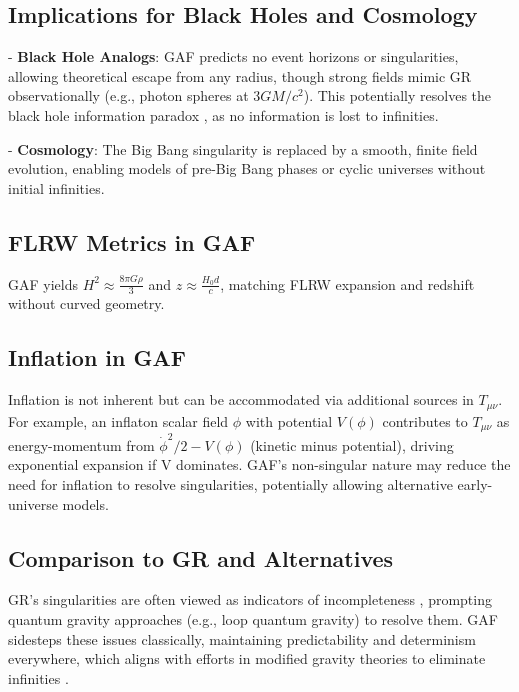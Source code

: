 \documentclass{article}
\begin{document}
\subsection{Implications for Black Holes and Cosmology}

- \textbf{Black Hole Analogs}: GAF predicts no event horizons or singularities, allowing theoretical escape from any radius, though strong fields mimic GR observationally (e.g., photon spheres at \( 3GM/c^2 \)). This potentially resolves the black hole information paradox \cite{Hawking1976}, as no information is lost to infinities.

- \textbf{Cosmology}: The Big Bang singularity is replaced by a smooth, finite field evolution, enabling models of pre-Big Bang phases or cyclic universes without initial infinities.

\subsection{FLRW Metrics in GAF}

GAF yields \( H^2 \approx \frac{8 \pi G \rho}{3} \) and \( z \approx \frac{H_0 d}{c} \), matching FLRW expansion and redshift without curved geometry.

\subsection{Inflation in GAF}

Inflation is not inherent but can be accommodated via additional sources in \( T_{\mu\nu} \). For example, an inflaton scalar field \(\phi\) with potential \(V(\phi)\) contributes to \( T_{\mu\nu} \) as energy-momentum from \(\dot{\phi}^2 / 2 - V(\phi)\) (kinetic minus potential), driving exponential expansion if V dominates. GAF's non-singular nature may reduce the need for inflation to resolve singularities, potentially allowing alternative early-universe models.

\subsection{Comparison to GR and Alternatives}

GR's singularities are often viewed as indicators of incompleteness \cite{Curiel2019}, prompting quantum gravity approaches (e.g., loop quantum gravity) to resolve them. GAF sidesteps these issues classically, maintaining predictability and determinism everywhere, which aligns with efforts in modified gravity theories to eliminate infinities \cite{Wald1997}.
\end{document}
